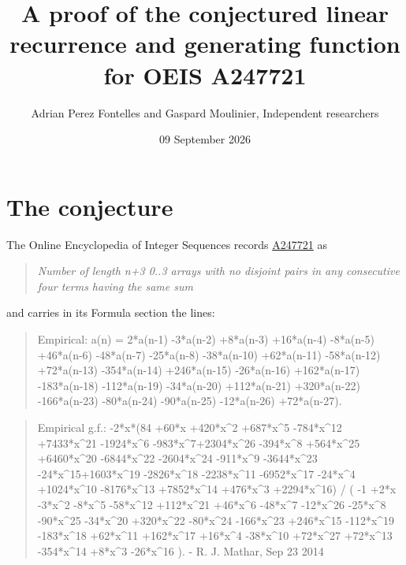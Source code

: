\documentclass[11pt]{article}
\title{A proof of the conjectured linear recurrence and generating function for OEIS A247721}
\author{Adrian Perez Fontelles and Gaspard Moulinier, Independent researchers}
\date{09 September 2026}
\theoremstyle{definition}
\begin{document}
\maketitle
\section{The conjecture}

The Online Encyclopedia of Integer Sequences records \href{https://oeis.org/A247721}{A247721} as

\begin{quote}\itshape Number of length n+3 0..3 arrays with no disjoint pairs in any consecutive four terms having the same sum\end{quote}

and carries in its Formula section the lines:

\begin{quote}\ttfamily Empirical: a(n) = 2*a(n-1) -3*a(n-2) +8*a(n-3) +16*a(n-4) -8*a(n-5) +46*a(n-6) -48*a(n-7) -25*a(n-8) -38*a(n-10) +62*a(n-11) -58*a(n-12) +72*a(n-13) -354*a(n-14) +246*a(n-15) -26*a(n-16) +162*a(n-17) -183*a(n-18) -112*a(n-19) -34*a(n-20) +112*a(n-21) +320*a(n-22) -166*a(n-23) -80*a(n-24) -90*a(n-25) -12*a(n-26) +72*a(n-27).\end{quote}

\begin{quote}\ttfamily Empirical g.f.: -2*x*(84 +60*x +420*x\textasciicircum{}2 +687*x\textasciicircum{}5 -784*x\textasciicircum{}12 +7433*x\textasciicircum{}21 -1924*x\textasciicircum{}6 -983*x\textasciicircum{}7+2304*x\textasciicircum{}26 -394*x\textasciicircum{}8 +564*x\textasciicircum{}25 +6460*x\textasciicircum{}20 -6844*x\textasciicircum{}22 -2604*x\textasciicircum{}24 -911*x\textasciicircum{}9 -3644*x\textasciicircum{}23 -24*x\textasciicircum{}15+1603*x\textasciicircum{}19 -2826*x\textasciicircum{}18 -2238*x\textasciicircum{}11 -6952*x\textasciicircum{}17 -24*x\textasciicircum{}4 +1024*x\textasciicircum{}10 -8176*x\textasciicircum{}13 +7852*x\textasciicircum{}14 +476*x\textasciicircum{}3 +2294*x\textasciicircum{}16) / ( -1 +2*x -3*x\textasciicircum{}2 -8*x\textasciicircum{}5 -58*x\textasciicircum{}12 +112*x\textasciicircum{}21 +46*x\textasciicircum{}6 -48*x\textasciicircum{}7 -12*x\textasciicircum{}26 -25*x\textasciicircum{}8 -90*x\textasciicircum{}25 -34*x\textasciicircum{}20 +320*x\textasciicircum{}22 -80*x\textasciicircum{}24 -166*x\textasciicircum{}23 +246*x\textasciicircum{}15 -112*x\textasciicircum{}19 -183*x\textasciicircum{}18 +62*x\textasciicircum{}11 +162*x\textasciicircum{}17 +16*x\textasciicircum{}4 -38*x\textasciicircum{}10 +72*x\textasciicircum{}27 +72*x\textasciicircum{}13 -354*x\textasciicircum{}14 +8*x\textasciicircum{}3 -26*x\textasciicircum{}16 ). - R. J. Mathar, Sep 23 2014\end{quote}
\end{document}
